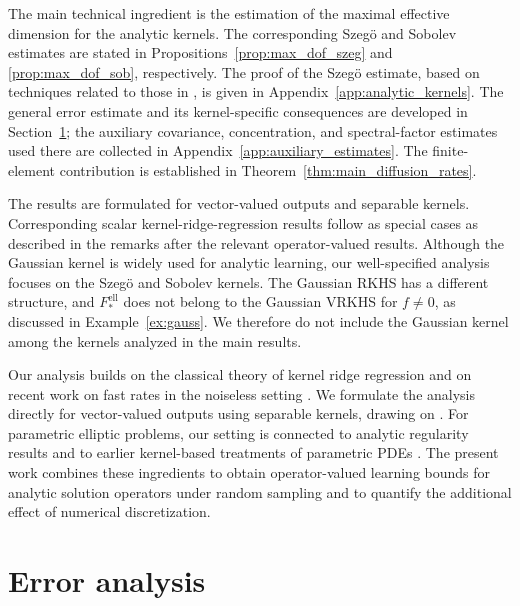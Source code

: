 \documentclass[11pt]{article}
\numberwithin{equation}{section}
\theoremstyle{plain}
\theoremstyle{definition}
\theoremstyle{remark}
\begin{document}
The main technical ingredient is the estimation of the maximal effective
dimension for the analytic kernels. The corresponding Szegö and Sobolev
estimates are stated in Propositions~\ref{prop:max_dof_szeg} and
\ref{prop:max_dof_sob}, respectively. The proof of the Szegö estimate, based
on techniques related to those in
\cite{dommel2024bound,dommel2025approximation}, is given in
Appendix~\ref{app:analytic_kernels}. The general error estimate and its
kernel-specific consequences are developed in
Section~\ref{sec:proof_details}; the auxiliary covariance, concentration, and
spectral-factor estimates used there are collected in
Appendix~\ref{app:auxiliary_estimates}. The finite-element contribution is
established in Theorem~\ref{thm:main_diffusion_rates}.

The results are formulated for vector-valued outputs and separable kernels.
Corresponding scalar kernel-ridge-regression results follow as special cases
as described in the remarks after the relevant operator-valued results.
Although the Gaussian kernel is widely used for analytic learning, our
well-specified analysis focuses on the Szegö and Sobolev kernels. The Gaussian
RKHS has a different structure, and $F_*^{\mathrm{ell}}$ does not belong to the Gaussian VRKHS for $f\neq0$, as discussed in
Example~\ref{ex:gauss}. We therefore do not include the Gaussian kernel
among the kernels analyzed in the main results.

Our analysis builds on the classical theory of kernel ridge regression
\cite{caponnetto2007optimal,bauer2007regularization,smale2007learning}
and on recent work on fast rates in the noiseless setting
\cite{cheng2024a,long2024duality,barzilai2024}. We formulate the analysis
directly for vector-valued outputs using separable kernels, drawing on
\cite{li2024towards,meunier2024optimal}. For parametric elliptic problems, our
setting is connected to analytic regularity results
\cite{cohen2010convergence,cohen2011analytic} and to earlier kernel-based
treatments of parametric PDEs
\cite{rieger2017sampling,griebel2017reproducing,kempf2019kernel}. The present
work combines these ingredients to obtain operator-valued learning bounds for
analytic solution operators under random sampling and to quantify the
additional effect of numerical discretization.

\section{Error analysis}
\label{sec:proof_details}
\end{document}
